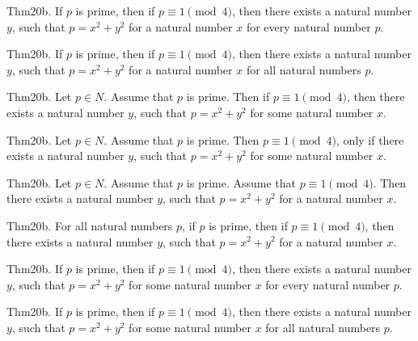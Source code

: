 \documentclass{article}
\begin{document}
Thm20b. If $p$ is prime, then if $p \equiv 1 \pmod{ 4}$, then there exists a natural number $y$, such that $p = x ^{ 2}+ y ^{ 2}$ for a natural number $x$ for every natural number $p$.

Thm20b. If $p$ is prime, then if $p \equiv 1 \pmod{ 4}$, then there exists a natural number $y$, such that $p = x ^{ 2}+ y ^{ 2}$ for a natural number $x$ for all natural numbers $p$.

Thm20b. Let $p \in N$. Assume that $p$ is prime. Then if $p \equiv 1 \pmod{ 4}$, then there exists a natural number $y$, such that $p = x ^{ 2}+ y ^{ 2}$ for some natural number $x$.

Thm20b. Let $p \in N$. Assume that $p$ is prime. Then $p \equiv 1 \pmod{ 4}$, only if there exists a natural number $y$, such that $p = x ^{ 2}+ y ^{ 2}$ for some natural number $x$.

Thm20b. Let $p \in N$. Assume that $p$ is prime. Assume that $p \equiv 1 \pmod{ 4}$. Then there exists a natural number $y$, such that $p = x ^{ 2}+ y ^{ 2}$ for a natural number $x$.

Thm20b. For all natural numbers $p$, if $p$ is prime, then if $p \equiv 1 \pmod{ 4}$, then there exists a natural number $y$, such that $p = x ^{ 2}+ y ^{ 2}$ for a natural number $x$.

Thm20b. If $p$ is prime, then if $p \equiv 1 \pmod{ 4}$, then there exists a natural number $y$, such that $p = x ^{ 2}+ y ^{ 2}$ for some natural number $x$ for every natural number $p$.

Thm20b. If $p$ is prime, then if $p \equiv 1 \pmod{ 4}$, then there exists a natural number $y$, such that $p = x ^{ 2}+ y ^{ 2}$ for some natural number $x$ for all natural numbers $p$.
\end{document}
